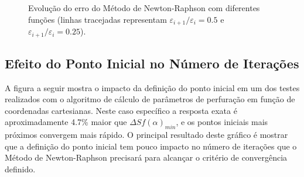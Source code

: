 \documentclass[final,3p,12pt]{elsarticle}
\begin{document}
\begin{figure}[hbt!] 
    \label{fig:Erro}
    \centering
    \caption{Evolução do erro do Método de Newton-Raphson com diferentes funções (linhas tracejadas representam $\varepsilon_{i+1} / \varepsilon_i = 0.5$ e $\varepsilon_{i+1} / \varepsilon_i = 0.25$).}
\end{figure}

\newpage
\FloatBarrier
\subsection{Efeito do Ponto Inicial no Número de Iterações}

A figura a seguir mostra o impacto da definição do ponto inicial em um dos testes realizados com o algoritmo de cálculo de parâmetros de perfuração em função de coordenadas cartesianas. Neste caso específico a resposta exata é aproximadamente 4.7\% maior que $\Delta S f(\alpha)_{min}$, e os pontos iniciais mais próximos convergem mais rápido. O principal resultado deste gráfico é mostrar que a definição do ponto inicial tem pouco impacto no número de iterações que o Método de Newton-Raphson precisará para alcançar o critério de convergência definido. 
\end{document}
